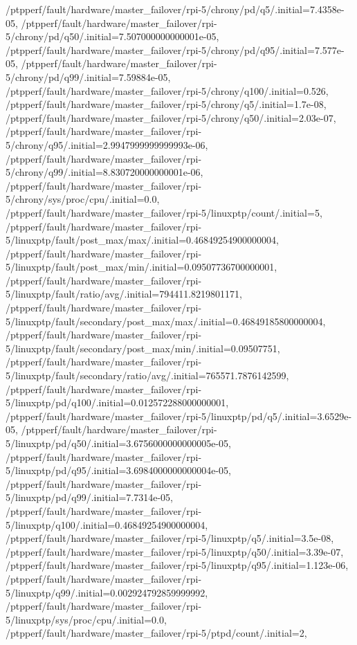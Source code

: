 {    /ptpperf/fault/hardware/master_failover/rpi-5/chrony/pd/q5/.initial=7.4358e-05,
    /ptpperf/fault/hardware/master_failover/rpi-5/chrony/pd/q50/.initial=7.507000000000001e-05,
    /ptpperf/fault/hardware/master_failover/rpi-5/chrony/pd/q95/.initial=7.577e-05,
    /ptpperf/fault/hardware/master_failover/rpi-5/chrony/pd/q99/.initial=7.59884e-05,
    /ptpperf/fault/hardware/master_failover/rpi-5/chrony/q100/.initial=0.526,
    /ptpperf/fault/hardware/master_failover/rpi-5/chrony/q5/.initial=1.7e-08,
    /ptpperf/fault/hardware/master_failover/rpi-5/chrony/q50/.initial=2.03e-07,
    /ptpperf/fault/hardware/master_failover/rpi-5/chrony/q95/.initial=2.9947999999999993e-06,
    /ptpperf/fault/hardware/master_failover/rpi-5/chrony/q99/.initial=8.830720000000001e-06,
    /ptpperf/fault/hardware/master_failover/rpi-5/chrony/sys/proc/cpu/.initial=0.0,
    /ptpperf/fault/hardware/master_failover/rpi-5/linuxptp/count/.initial=5,
    /ptpperf/fault/hardware/master_failover/rpi-5/linuxptp/fault/post_max/max/.initial=0.46849254900000004,
    /ptpperf/fault/hardware/master_failover/rpi-5/linuxptp/fault/post_max/min/.initial=0.09507736700000001,
    /ptpperf/fault/hardware/master_failover/rpi-5/linuxptp/fault/ratio/avg/.initial=794411.8219801171,
    /ptpperf/fault/hardware/master_failover/rpi-5/linuxptp/fault/secondary/post_max/max/.initial=0.46849185800000004,
    /ptpperf/fault/hardware/master_failover/rpi-5/linuxptp/fault/secondary/post_max/min/.initial=0.09507751,
    /ptpperf/fault/hardware/master_failover/rpi-5/linuxptp/fault/secondary/ratio/avg/.initial=765571.7876142599,
    /ptpperf/fault/hardware/master_failover/rpi-5/linuxptp/pd/q100/.initial=0.012572288000000001,
    /ptpperf/fault/hardware/master_failover/rpi-5/linuxptp/pd/q5/.initial=3.6529e-05,
    /ptpperf/fault/hardware/master_failover/rpi-5/linuxptp/pd/q50/.initial=3.6756000000000005e-05,
    /ptpperf/fault/hardware/master_failover/rpi-5/linuxptp/pd/q95/.initial=3.6984000000000004e-05,
    /ptpperf/fault/hardware/master_failover/rpi-5/linuxptp/pd/q99/.initial=7.7314e-05,
    /ptpperf/fault/hardware/master_failover/rpi-5/linuxptp/q100/.initial=0.46849254900000004,
    /ptpperf/fault/hardware/master_failover/rpi-5/linuxptp/q5/.initial=3.5e-08,
    /ptpperf/fault/hardware/master_failover/rpi-5/linuxptp/q50/.initial=3.39e-07,
    /ptpperf/fault/hardware/master_failover/rpi-5/linuxptp/q95/.initial=1.123e-06,
    /ptpperf/fault/hardware/master_failover/rpi-5/linuxptp/q99/.initial=0.002924792859999992,
    /ptpperf/fault/hardware/master_failover/rpi-5/linuxptp/sys/proc/cpu/.initial=0.0,
    /ptpperf/fault/hardware/master_failover/rpi-5/ptpd/count/.initial=2,
}
